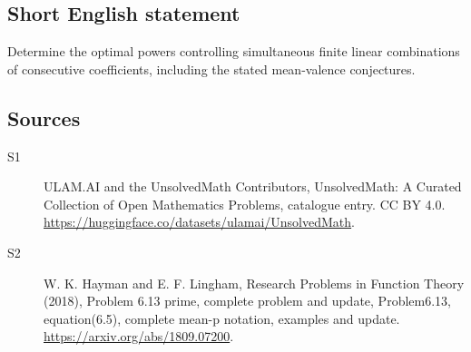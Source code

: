 \documentclass[11pt]{article}
\begin{document}
\subsection{Short English statement}
Determine the optimal powers controlling simultaneous finite linear combinations of consecutive coefficients, including the stated mean-valence conjectures.
\subsection{Sources}
\begin{description}
\item[\hypertarget{source:statement:1}{S1}] ULAM.AI and the UnsolvedMath Contributors, UnsolvedMath: A Curated Collection of Open Mathematics Problems, catalogue entry. CC BY 4.0. \url{https://huggingface.co/datasets/ulamai/UnsolvedMath}.
\item[\hypertarget{source:statement:2}{S2}] W. K. Hayman and E. F. Lingham, Research Problems in Function Theory (2018), Problem 6.13 prime, complete problem and update, Problem6.13, equation(6.5), complete mean-p notation, examples and update. \url{https://arxiv.org/abs/1809.07200}.
\end{description}
\label{end:statement}
\end{document}
